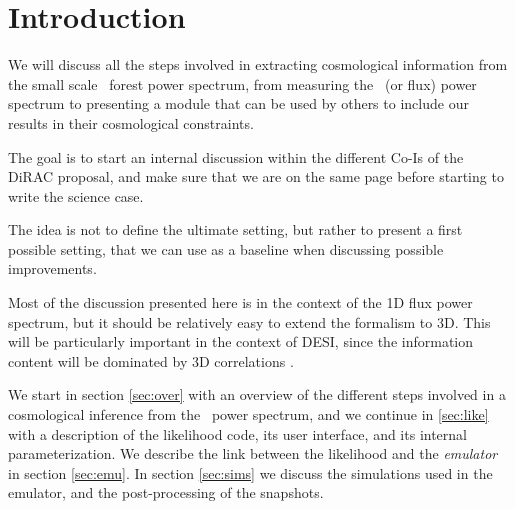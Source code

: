 \section{Introduction} 

We will discuss all the steps involved in extracting cosmological information
from the small scale \lya\ forest power spectrum, from measuring the
\lya\ (or flux) power spectrum to presenting a module that can be used
by others to include our results in their cosmological constraints.

The goal is to start an internal discussion within the different Co-Is
of the DiRAC proposal, and make sure that we are on the same page before
starting to write the science case. 

The idea is not to define the ultimate setting, but rather to present a
first possible setting, that we can use as a baseline when discussing
possible improvements.

Most of the discussion presented here is in the context of the 1D flux power
spectrum, but it should be relatively easy to extend the formalism to 3D.
This will be particularly important in the context of DESI, since the
information content will be dominated by 3D correlations 
\cite{Font-Ribera2014,Font-Ribera2018}.

We start in section \ref{sec:over} with an overview of the different steps 
involved in a cosmological inference from the \lya\ power spectrum, and we 
continue in \ref{sec:like} with a description of the likelihood code, 
its user interface, and its internal parameterization. 
We describe the link between the likelihood and the \textit{emulator} in
section \ref{sec:emu}.
In section \ref{sec:sims} we discuss the simulations used in the emulator, 
and the post-processing of the snapshots. 
 
